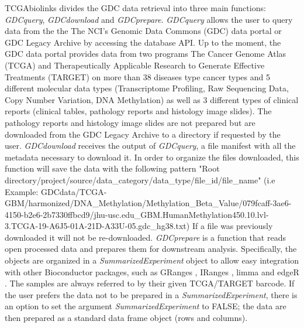 TCGAbiolinks divides the GDC data retrieval into three main functions: \textit{GDCquery}, \textit{GDCdownload}
and \textit{GDCprepare}.
\textit{GDCquery} allows the user to query data from the the The NCI's Genomic Data Commons (GDC) data portal or GDC Legacy Archive by accessing the database API. Up to the moment, the GDC data portal provides data from two programs The Cancer Genome Atlas (TCGA) and Therapeutically Applicable Research to Generate Effective Treatments (TARGET)  on more
than 38 diseases type cancer types and 5 different molecular data types (Transcriptome Profiling, Raw Sequencing Data, Copy Number Variation, DNA Methylation) as well as 3 different types of clinical reports (clinical tables, pathology reports and histology image slides). The pathology
reports and histology image slides are not prepared
but are downloaded from the GDC Legacy Archive to a directory if requested by the user. \textit{GDCdownload} receives the output of \textit{GDCquery}, a file manifest with all the metadata necessary to download it. In order to organize the files downloaded, this function will save the data with the following pattern "Root directory/project/source/data\_category/data\_type/file\_id/file\_name" (i.e Example: GDCdata/TCGA-GBM/harmonized/DNA\_Methylation/Methylation\_Beta\_Value/079fcaff-3ae6-4150-b2e6-2b7330ffbcd9/jhu-usc.edu\_GBM.HumanMethylation450.10.lvl-3.TCGA-19-A6J5-01A-21D-A33U-05.gdc\_hg38.txt)
If a file was
previously downloaded it will not be re-downloaded. \textit{GDCprepare} is a function that reads open processed data and prepares them for downstream analysis. Specifically, the objects are organized in a \textit{SummarizedExperiment}
object to allow easy integration
with other Bioconductor packages, such as GRanges \cite{lawrence2013software},
IRanges \cite{lawrence2013software}, limma \cite{ritchie2015limma} and edgeR \cite{robinson2010edger}. The samples are
always referred to by their given TCGA/TARGET barcode. If the user prefers the data not to be prepared in a \textit{SummarizedExperiment},
there is an option to set the argument \textit{SummarizedExperiment}
to FALSE; the data are then prepared as
a standard data frame object (rows and columns).

